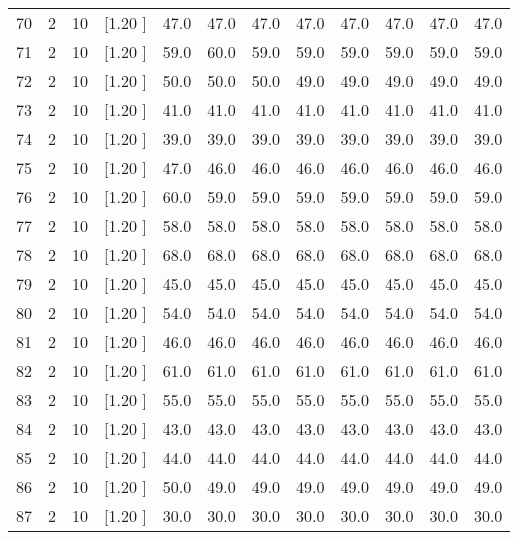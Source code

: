 \documentclass[12pt,a4paper]{article}
\begin{document}
\begin{center}
{\begin{tabular}{r r r r r r r r r r r r}
  70&  2& 10&[1.20      ]&    47.0&    47.0&    47.0&    47.0&    47.0&    47.0&    47.0&    47.0\\[-0.02in]
  71&  2& 10&[1.20      ]&    59.0&    60.0&    59.0&    59.0&    59.0&    59.0&    59.0&    59.0\\[-0.02in]
  72&  2& 10&[1.20      ]&    50.0&    50.0&    50.0&    49.0&    49.0&    49.0&    49.0&    49.0\\[-0.02in]
  73&  2& 10&[1.20      ]&    41.0&    41.0&    41.0&    41.0&    41.0&    41.0&    41.0&    41.0\\[-0.02in]
  74&  2& 10&[1.20      ]&    39.0&    39.0&    39.0&    39.0&    39.0&    39.0&    39.0&    39.0\\[-0.02in]
  75&  2& 10&[1.20      ]&    47.0&    46.0&    46.0&    46.0&    46.0&    46.0&    46.0&    46.0\\[-0.02in]
  76&  2& 10&[1.20      ]&    60.0&    59.0&    59.0&    59.0&    59.0&    59.0&    59.0&    59.0\\[-0.02in]
  77&  2& 10&[1.20      ]&    58.0&    58.0&    58.0&    58.0&    58.0&    58.0&    58.0&    58.0\\[-0.02in]
  78&  2& 10&[1.20      ]&    68.0&    68.0&    68.0&    68.0&    68.0&    68.0&    68.0&    68.0\\[-0.02in]
  79&  2& 10&[1.20      ]&    45.0&    45.0&    45.0&    45.0&    45.0&    45.0&    45.0&    45.0\\[-0.02in]
  80&  2& 10&[1.20      ]&    54.0&    54.0&    54.0&    54.0&    54.0&    54.0&    54.0&    54.0\\[-0.02in]
  81&  2& 10&[1.20      ]&    46.0&    46.0&    46.0&    46.0&    46.0&    46.0&    46.0&    46.0\\[-0.02in]
  82&  2& 10&[1.20      ]&    61.0&    61.0&    61.0&    61.0&    61.0&    61.0&    61.0&    61.0\\[-0.02in]
  83&  2& 10&[1.20      ]&    55.0&    55.0&    55.0&    55.0&    55.0&    55.0&    55.0&    55.0\\[-0.02in]
  84&  2& 10&[1.20      ]&    43.0&    43.0&    43.0&    43.0&    43.0&    43.0&    43.0&    43.0\\[-0.02in]
  85&  2& 10&[1.20      ]&    44.0&    44.0&    44.0&    44.0&    44.0&    44.0&    44.0&    44.0\\[-0.02in]
  86&  2& 10&[1.20      ]&    50.0&    49.0&    49.0&    49.0&    49.0&    49.0&    49.0&    49.0\\[-0.02in]
  87&  2& 10&[1.20      ]&    30.0&    30.0&    30.0&    30.0&    30.0&    30.0&    30.0&    30.0\\[-0.02in]

\end{tabular}}
\end{center}
\end{document}
